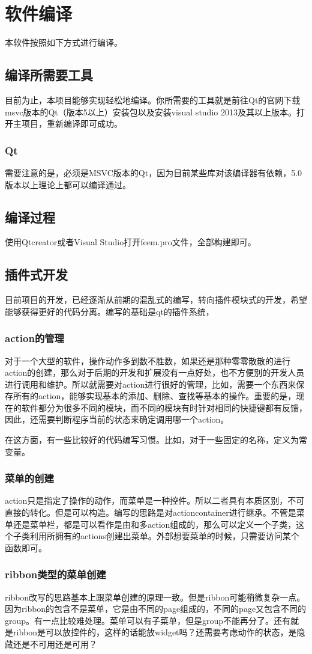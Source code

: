 \chapter{软件编译}
本软件按照如下方式进行编译。
\section{编译所需要工具}
目前为止，本项目能够实现轻松地编译。你所需要的工具就是前往Qt的官网下载msvc版本的Qt（版本5以上）安装包以及安装visual studio 2013及其以上版本。打开主项目，重新编译即可成功。
\subsection{Qt}
需要注意的是，必须是MSVC版本的Qt，因为目前某些库对该编译器有依赖，5.0版本以上理论上都可以编译通过。
\section{编译过程}
使用Qtcreator或者Visual Studio打开feem.pro文件，全部构建即可。
\section{插件式开发}
目前项目的开发，已经逐渐从前期的混乱式的编写，转向插件模块式的开发，希望能够获得更好的代码分离。编写的基础是qt的插件系统，
\subsection{action的管理}
对于一个大型的软件，操作动作多到数不胜数，如果还是那种零零散散的进行action的创建，那么对于后期的开发和扩展没有一点好处，也不方便别的开发人员进行调用和维护。所以就需要对action进行很好的管理，比如，需要一个东西来保存所有的action，能够实现基本的添加、删除、查找等基本的操作。重要的是，现在的软件都分为很多不同的模块，而不同的模块有时针对相同的快捷键都有反馈，因此，还需要判断程序当前的状态来确定调用哪一个action。

在这方面，有一些比较好的代码编写习惯。比如，对于一些固定的名称，定义为常变量。
\subsection{菜单的创建}
action只是指定了操作的动作，而菜单是一种控件。所以二者具有本质区别，不可直接的转化。但是可以构造。编写的思路是对actioncontainer进行继承。不管是菜单还是菜单栏，都是可以看作是由和多action组成的，那么可以定义一个子类，这个子类利用所拥有的actions创建出菜单。外部想要菜单的时候，只需要访问某个函数即可。
\subsection{ribbon类型的菜单创建}
ribbon改写的思路基本上跟菜单创建的原理一致。但是ribbon可能稍微复杂一点。因为ribbon的包含不是菜单，它是由不同的page组成的，不同的page又包含不同的group。有一点比较难处理。菜单可以有子菜单，但是group不能再分了。还有就是ribbon是可以放控件的，这样的话能放widget吗？还需要考虑动作的状态，是隐藏还是不可用还是可用？

